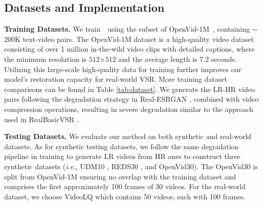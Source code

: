 \subsection{Datasets and Implementation}
\noindent
\textbf{Training Datasets.}
We train~\name~using the subset of OpenVid-1M~\cite{nan2024openvid}, containing $\sim$200K text-video pairs. The OpenVid-1M dataset is a high-quality video dataset consisting of over 1 million in-the-wild video clips with detailed captions, where the minimum resolution is $512$$\times$$512$ and the average length is 7.2 seconds. Utilizing this large-scale high-quality data for training further improves our model's restoration capacity for real-world VSR. More training dataset comparisons can be found in Table \ref{tab:dataset}.
We generate the LR-HR video pairs following the degradation strategy in Real-ESRGAN \cite{wang2021realesrgan}, combined with video compression operations, resulting in severe degradation similar to the approach used in RealBasicVSR \cite{chan2022investigating}.

\begin{table}[]
    \centering
    \caption{Training dataset comparison.}
    \label{tab:dataset}
\end{table}


\noindent
\textbf{Testing Datasets.}
We evaluate our method on both synthetic and real-world datasets. 
As for synthetic testing datasets, we follow the same degradation pipeline in training to generate LR videos from HR ones to construct three synthetic datasets (\textit{i.e.}, UDM10 \cite{yi2019progressive}, REDS30 \cite{nah2019ntire}, and OpenVid30). The OpenVid30 is split from OpenVid-1M \cite{nan2024openvid} ensuring no overlap with the training dataset and comprises the first approximately 100 frames of 30 videos. For the real-world dataset, we choose VideoLQ \cite{chan2022investigating} which contains 50 videos, each with 100 frames.


